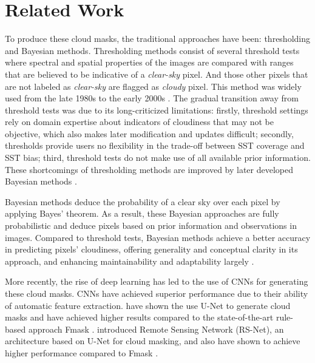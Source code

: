 \documentclass[sigplan,screen]{acmart}
\begin{document}
\section{Related Work}

To produce these cloud masks, the traditional approaches have been: thresholding \cite{Saunders1986AnAS,Saunders1988AnIM} and Bayesian\cite{Merchant2005ProbabilisticPB} methods. Thresholding methods consist of several threshold tests where spectral and spatial properties of the images are compared with ranges that are believed to be indicative of a {\em clear-sky} pixel. And those other pixels that are not labeled as {\em clear-sky} are flagged as {\em cloudy} pixel. This method was widely used from the late 1980s to the early 2000s \cite{Merchant2005ProbabilisticPB}. The gradual transition away from threshold tests was due to its long-criticized limitations: firstly, threshold settings rely on domain expertise about indicators of cloudiness that may not be objective, which also makes later modification and updates difficult; secondly, thresholds provide users no flexibility in the trade-off between SST coverage and SST bias; third, threshold tests do not make use of all available prior information. These shortcomings of thresholding methods are improved by later developed Bayesian methods \cite{Merchant2005ProbabilisticPB}.


Bayesian methods deduce the probability of a clear sky over each pixel by applying Bayes' theorem. As a result, these Bayesian approaches are fully probabilistic and deduce pixels based on prior information and observations in images. Compared to threshold tests, Bayesian methods achieve a better accuracy in predicting pixels' cloudiness, offering generality and conceptual clarity in its approach, and enhancing maintainability and adaptability largely \cite{Merchant2005ProbabilisticPB}. 

More recently, the rise of deep learning has led to the use of CNNs for generating these cloud masks. CNNs have achieved superior performance due to their ability of automatic feature extraction. \cite{WIELAND2019111203} have shown the use U-Net to generate cloud masks and have achieved higher results compared to the state-of-the-art rule-based approach Fmask  \cite{Zhu2012ObjectbasedCA}. \cite{JEPPESEN2019247} introduced Remote Sensing Network (RS-Net), an architecture based on U-Net for cloud masking, and also have shown to achieve higher performance compared to Fmask \cite{Zhu2012ObjectbasedCA}.
\end{document}
